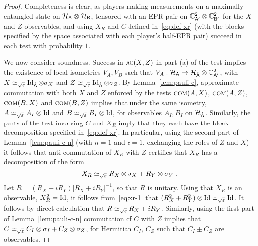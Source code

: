 \begin{proof}
Completeness is clear, as players making measurements on a maximally entangled state on $\mathcal{H}_{{\textsf{A}}}\otimes \mathcal{H}_{{\textsf{B}}}$, tensored with an EPR pair on $\mathbb{C}^2_{{\textsf{A}}'} \otimes \mathbb{C}^2_{{\textsf{B}}'}$ for the $X$ and $Z$ observables, and using $X_R$ and $C$ defined in~\eqref{eq:def-xr} (with the blocks specified by the space associated with each player's half-EPR pair) succeed in each test with probability $1$. 

We now consider soundness. Success in $\textsc{ac}(X,Z)$ in part (a) of the test implies the existence of local isometries $V_A,V_B$ such that $V_A:\mathcal{H}_{\textsf{A}}\to \mathcal{H}_{\hat{{\textsf{A}}}}\otimes \mathbb{C}^2_{{\textsf{A}}'}$, with $X\simeq_{\sqrt{\varepsilon}} \mathop{\rm Id}\nolimits_{\hat{{\textsf{A}}}}\otimes \sigma_X$ and $Z\simeq_{\sqrt{\varepsilon}} \mathop{\rm Id}\nolimits_{\hat{{\textsf{A}}}}\otimes\sigma_Z$. By Lemma~\ref{lem:pauli-c}, approximate commutation with both $X$ and $Z$ enforced by the tests $\textsc{com}(A,X)$, $\textsc{com}(A,Z)$, $\textsc{com}(B,X)$ and $\textsc{com}(B,Z)$ implies that under the same isometry, $A\simeq_{\sqrt{\varepsilon}} A_I \otimes \mathop{\rm Id}\nolimits$ and $B\simeq_{\sqrt{\varepsilon}} B_I \otimes \mathop{\rm Id}\nolimits$, for observables $A_I, B_I$ on $\mathcal{H}_{\hat{{\textsf{A}}}}$. Similarly, the parts of the test involving $C$ and $X_R$ imply that they each have the block decomposition specified in~\eqref{eq:def-xr}. 
In particular, using the second part of Lemma~\ref{lem:pauli-c-n} (with $n=1$ and $c=1$, exchanging the roles of $Z$ and $X$) it follows that anti-commutation of $X_R$ with $Z$ certifies that $X_R$ has  a decomposition of the form  
\begin{equation}\label{xr-1}
X_R \simeq_{\sqrt{\varepsilon}} R_X \otimes \sigma_X + R_Y \otimes \sigma_Y\;.
\end{equation}
Let $R = ( R_X + i R_Y)| R_X + i R_Y|^{-1}$, so that $R$ is unitary. Using that $X_R$ is an observable, $X_R^2=\mathop{\rm Id}\nolimits$, it follows from~\eqref{eq:xr-1} that $(R_X^2+R_Y^2)\otimes \mathop{\rm Id}\nolimits \simeq_{\sqrt{\varepsilon}} \mathop{\rm Id}\nolimits$. It follows by direct calculation that $R \simeq_{\sqrt{\varepsilon}} R_X + i R_Y$. 
 Similarly, using the first part of Lemma~\ref{lem:pauli-c-n} commutation of $C$ with $Z$ implies that $C \simeq_{\sqrt{\varepsilon}} C_I \otimes \sigma_I + C_Z \otimes \sigma_Z$, for Hermitian $C_I$, $C_Z$ such that $C_I \pm C_Z$ are observables. 




\end{proof}
